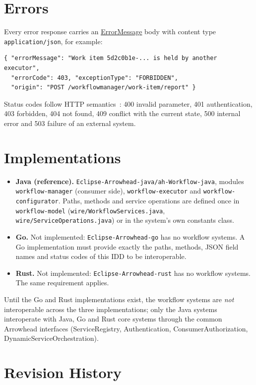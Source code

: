 \documentclass[a4paper]{arrowhead}
\newcommand{\mref}[1]{{\textcolor{ArrowheadPurple}{\hyperref[sec:model:#1]{#1}}}}
\begin{document}
\section{Errors}
\label{sec:errors}
Every error response carries an \mref{ErrorMessage} body with content type \texttt{application/json}, for example:
\begin{lstlisting}
{ "errorMessage": "Work item 5d2c0b1e-... is held by another executor",
  "errorCode": 403, "exceptionType": "FORBIDDEN",
  "origin": "POST /workflowmanager/work-item/report" }
\end{lstlisting}
Status codes follow HTTP semantics~\cite{rfc9110}: 400 invalid parameter, 401 authentication, 403 forbidden, 404 not
found, 409 conflict with the current state, 500 internal error and 503 failure of an external system.


\section{Implementations}
\label{sec:implementations}
\begin{itemize}
\item \textbf{Java (reference).} \texttt{Eclipse-Arrowhead-java/ah-Workflow-java}, modules \texttt{workflow-manager} (consumer side), \texttt{workflow-executor} and \texttt{workflow-configurator}. Paths, methods and service
operations are defined once in \texttt{workflow-model} (\texttt{wire/WorkflowServices.java}, \texttt{wire/ServiceOperations.java}) or in the system's own constants class.
\item \textbf{Go.} Not implemented: \texttt{Eclipse-Arrowhead-go} has no workflow systems. A Go implementation must
provide exactly the paths, methods, JSON field names and status codes of this IDD to be interoperable.
\item \textbf{Rust.} Not implemented: \texttt{Eclipse-Arrowhead-rust} has no workflow systems. The same requirement applies.
\end{itemize}
Until the Go and Rust implementations exist, the workflow systems are \emph{not} interoperable across the three
implementations; only the Java systems interoperate with Java, Go and Rust core systems through the common Arrowhead
interfaces (ServiceRegistry, Authentication, ConsumerAuthorization, DynamicServiceOrchestration).


\newpage



\newpage

\section{Revision History}
\end{document}
